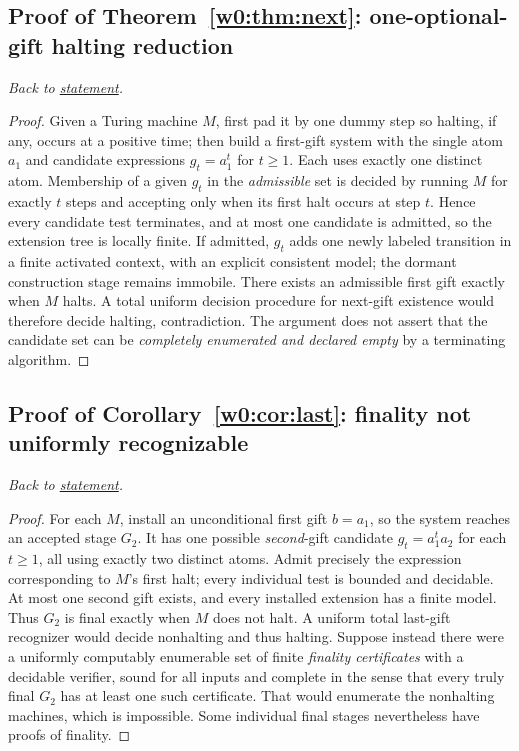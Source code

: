 \documentclass[11pt,letterpaper]{article}
\theoremstyle{definition}\newtheorem{definition}[theorem]{Definition}\newtheorem{example}[theorem]{Example}
\theoremstyle{remark}\newtheorem{remark}[theorem]{Remark}
\begin{document}
\subsection{Proof of Theorem~\ref{w0:thm:next}: one-optional-gift halting reduction}\label{w0:pr:next}
\textit{Back to \hyperref[w0:thm:next]{statement}.}
\begin{proof}
Given a Turing machine $M$, first pad it by one dummy step so halting, if any, occurs at a positive time; then build a first-gift system with the single atom $a_1$ and candidate expressions $g_t=a_1^t$ for $t\ge1$. Each uses exactly one distinct atom. Membership of a given $g_t$ in the \emph{admissible} set is decided by running $M$ for exactly $t$ steps and accepting only when its first halt occurs at step $t$. Hence every candidate test terminates, and at most one candidate is admitted, so the extension tree is locally finite. If admitted, $g_t$ adds one newly labeled transition in a finite activated context, with an explicit consistent model; the dormant construction stage remains immobile. There exists an admissible first gift exactly when $M$ halts. A total uniform decision procedure for next-gift existence would therefore decide halting, contradiction. The argument does not assert that the candidate set can be \emph{completely enumerated and declared empty} by a terminating algorithm.
\end{proof}


\subsection{Proof of Corollary~\ref{w0:cor:last}: finality not uniformly recognizable}\label{w0:pr:last}
\textit{Back to \hyperref[w0:cor:last]{statement}.}
\begin{proof}
For each $M$, install an unconditional first gift $b=a_1$, so the system reaches an accepted stage $G_2$. It has one possible \emph{second}-gift candidate $g_t=a_1^t a_2$ for each $t\ge1$, all using exactly two distinct atoms. Admit precisely the expression corresponding to $M$'s first halt; every individual test is bounded and decidable. At most one second gift exists, and every installed extension has a finite model. Thus $G_2$ is final exactly when $M$ does not halt. A uniform total last-gift recognizer would decide nonhalting and thus halting. Suppose instead there were a uniformly computably enumerable set of finite \emph{finality certificates} with a decidable verifier, sound for all inputs and complete in the sense that every truly final $G_2$ has at least one such certificate. That would enumerate the nonhalting machines, which is impossible. Some individual final stages nevertheless have proofs of finality.
\end{proof}
\end{document}
